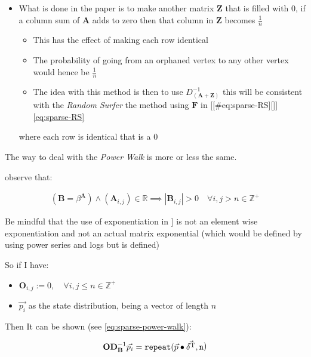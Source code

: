 \documentclass[11pt]{article}
\begin{document}
\begin{enumerate}
\begin{itemize}
\begin{itemize}
\item What is done in the paper is to make another matrix \(\mathbf{Z}\)
that is filled with 0, if a column sum of \(\mathbf{A}\) adds to zero
then that column in \(\mathbf{Z}\) becomes \(\frac{1}{n}\)

\begin{itemize}
\item This has the effect of making each row identical

\item The probability of going from an orphaned vertex to any other
vertex would hence be \(\frac{1}{n}\)

\item The idea with this method is then to use
\(D_\mathbf{\left( A+Z \right)}^{- 1}\) this will be consistent with
the \emph{Random Surfer} the method using \(\mathbf{F}\) in
[[\#eq:sparse-RS][]] \eqref{eq:sparse-RS}
\end{itemize}

where each row is identical that is a 0
\end{itemize}
\end{itemize}

The way to deal with the \emph{Power Walk} is more or less the same.

observe that:

$$\begin{aligned}
   \left( \mathbf{B} = \beta^{\mathbf{A}} \right)\wedge \left( \mathbf{A}_{i, j}\right)\in \mathbb{R}  \implies  \left\lvert \mathbf{B}_{i, j} \right\rvert > 0 \quad \forall i,j>n\in \mathbb{Z}^+ \label{eq:b-is-pos}\end{aligned}$$



Be mindful that the use of exponentiation in
] is not an element wise exponentiation
and not an actual matrix exponential (which would be defined by using
power series and logs but is defined)

So if I have:

\begin{itemize}
\item \(\mathbf{O}_{i, j} := 0, \quad \forall i,j\leq n \in \mathbb{Z}^+\)

\item \(\vec{p_i}\) as the state distribution, being a vector of length \(n\)
\end{itemize}

Then It can be shown (see \eqref{eq:sparse-power-walk}):

$$\begin{aligned}
    \mathbf{O} \mathbf{D}_{\mathbf{B}}^{-1} \vec{p_i} = \mathtt{repeat} (\vec{p} \bullet \vec{\delta^{\tiny \mathrm{T}}} \mathtt{, n}\end{aligned})$$




\end{enumerate}
\end{document}
